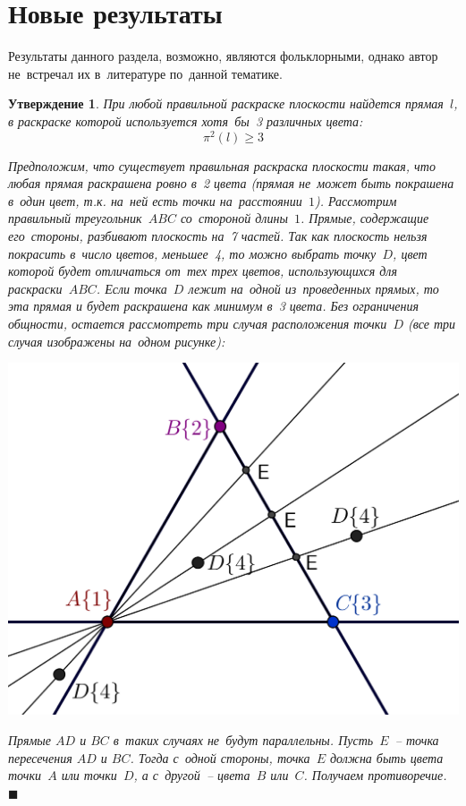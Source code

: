 \documentclass{report}%
\newtheorem{claim}{Утверждение}
\newenvironment{proof}{\par\noindent{\bf Доказательство.}}{\hfill$\scriptstyle\blacksquare$}
\begin{document}
\section{Новые результаты}

Результаты данного раздела, возможно, являются фольклорными, однако автор не~встречал их в~литературе по~данной тематике.

\begin{claim}
		При любой правильной раскраске плоскости найдется прямая~$l$, в раскраске которой используется хотя~бы~3 различных цвета:
		\begin{equation}
				\pi^2(l) \geq 3
		\end{equation}
		\begin{proof}
				Предположим, что существует правильная раскраска плоскости такая,
				что любая прямая раскрашена ровно в~2 цвета (прямая не~может быть покрашена в~один цвет,
				т.к. на~ней есть точки на~расстоянии~$1$). Рассмотрим правильный треугольник~$ABC$ со~стороной длины~$1$.
				Прямые, содержащие его~стороны, разбивают  плоскость на~7 частей.
				Так как плоскость нельзя покрасить в~число цветов, меньшее~4, то можно выбрать точку~$D$,
				цвет которой будет отличаться от~тех трех цветов, использующихся для раскраски~$ABC$.
				Если точка~$D$ лежит на~одной из~проведенных прямых, то эта прямая и будет раскрашена как минимум в~3 цвета.
				Без ограничения общности, остается рассмотреть три случая расположения точки~$D$ (все три случая изображены на~одном рисунке): \\
				\begin{center}
						\includegraphics[scale = 0.5]{my_claim1}
				\end{center}
				
				\noindent Прямые $AD$ и $BC$ в~таких случаях не~будут параллельны. Пусть~$E$~– точка пересечения $AD$ и $BC$.
				Тогда с~одной стороны, точка~$E$ должна быть цвета точки~$A$ или точки~$D$, а с~другой~– цвета~$B$ или~$C$. Получаем противоречие. 
		\end{proof}
\end{claim}
\end{document}
